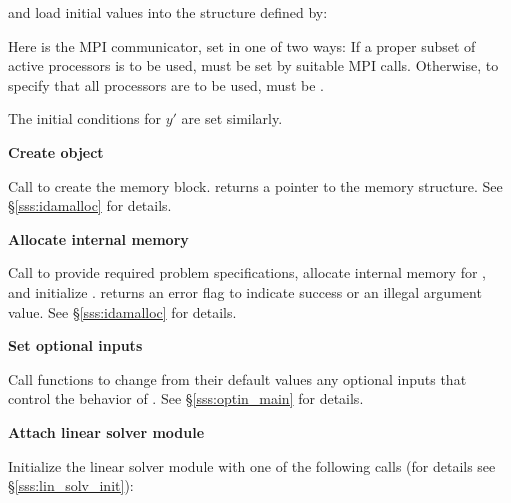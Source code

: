 \begin{Steps}
  {\p} 

  and load initial values into the structure defined by:

  {\s} 

  {\p} 

  Here  is the MPI communicator, set in one of two ways: 
  If a proper subset of active processors is to be used,  
  must be set by suitable MPI calls. Otherwise, to specify that all 
  processors are to be used,  must be .
  
  The initial conditions for $y'$ are set similarly.

\item\label{i:ida_create} 
  {\bf Create {\ida} object}

  Call \id{();} 
  to create the {\ida} memory block.
   returns a pointer to the {\ida} memory structure.
  See \S\ref{sss:idamalloc} for details.

\item\label{i:ida_malloc} 
  {\bf Allocate internal memory}

  Call  
  to provide required problem specifications,
  allocate internal memory for {\ida}, 
  and initialize {\ida}.
   returns an error flag to indicate success or an illegal argument
  value.  See \S\ref{sss:idamalloc} for details.
  
\item
  {\bf Set optional inputs}

  Call  functions to change from their default values any
  optional inputs that control the behavior of {\ida}.
  See \S\ref{sss:optin_main} for details.

\item\label{i:lin_solver} 
  {\bf Attach linear solver module}

  Initialize the linear solver module
  with one of the following calls (for details see \S\ref{sss:lin_solv_init}):

  {\s} 

  {\s} 





\end{Steps}
